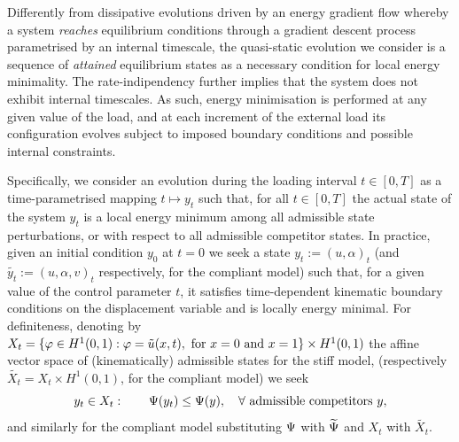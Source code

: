 Differently from dissipative evolutions driven by an energy gradient flow whereby a system \emph{reaches} equilibrium conditions through a gradient descent process parametrised by an internal timescale, the quasi-static evolution we consider is a sequence of \emph{attained} equilibrium states as a necessary condition for local energy minimality. 
The rate-indipendency further implies that the system does not exhibit internal timescales.
As such, energy minimisation is performed at any given value of the load, and at each increment of the external load its configuration evolves subject to imposed boundary conditions and possible internal constraints.
% 

Specifically, we consider an evolution during the loading interval $t\in [0, T]$ as a time-parametrised mapping $t\mapsto y_t$  such that, for all $t\in [0, T]$ the actual state of the system $y_t$ is a local energy minimum among all admissible state perturbations, or with respect to all admissible competitor states. %
In practice, given an initial condition $y_0$ at $t=0$ we seek a state $y_t:=(u, \alpha)_t$ (and $\widetilde{y_t}:=(u, \alpha, v)_t$ respectively, for the compliant model) such that, for a given value of the control parameter $t$, it satisfies time-dependent kinematic boundary conditions on the displacement variable and is locally energy minimal. 
For definiteness, denoting by $X_t = \{\varphi\in H^1(0, 1):\varphi=\tilde u(x, t),\text{ for } x=0\text{ and } x=1\}\times H^1(0,1)$ the affine vector space of (kinematically) admissible states for the stiff model, (respectively $\widetilde{X_t} = X_t\times H^1(0, 1)$, for the compliant model) 
we seek 
\begin{equation}
    \label{eq:variational_global_ineq}
    y_t\in X_t: \qquad \Psi(y_t) \leq \Psi(y),\quad \forall \text{ admissible competitors } y,
\end{equation}
and similarly for the compliant model substituting $\Psi$ with $\widetilde\Psi$ and $X_t$ with $\widetilde{X_t}$.
